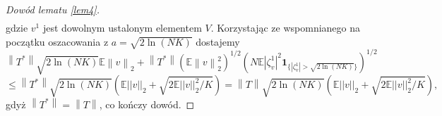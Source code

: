 \documentclass[man,mfiu]{mgrwms}
\newcommand{\norm}[1]{\left\lVert#1\right\rVert}
\begin{document}
\begin{proof}[Dowód lematu \ref{lem4}]
\begin{displaymath}
\begin{split}
\end{split}
\end{displaymath}
gdzie $v^1$ jest dowolnym ustalonym elementem $V$.
Korzystając ze wspomnianego na początku oszacowania z $a=\sqrt{2\ln (NK)}$ dostajemy
\begin{displaymath}
\norm{T^*}\sqrt{2\ln (NK)}\mathbb{E}\norm{v}_2+\norm{T^*}\left(\mathbb{E}\norm{v}_2^2\right)^{1/2}\left(N\mathbb{E}|\zeta_v^1|^2\pmb{1}_{\{|\zeta_v^1|> \sqrt{2\ln (NK)}\}}\right)^{1/2}
\end{displaymath}
\begin{displaymath}
\leq \norm{T^*}\sqrt{2\ln (NK)}\left(\mathbb{E}||v||_2+\sqrt{2\mathbb{E}||v||_2^2/K}\right)=\norm{T}\sqrt{2\ln (NK)}\left(\mathbb{E}||v||_2+\sqrt{2\mathbb{E}||v||_2^2/K}\right),
\end{displaymath}
 gdyż $\norm{T^*}=\norm{T}$, co kończy dowód.
\end{proof}
\end{document}
